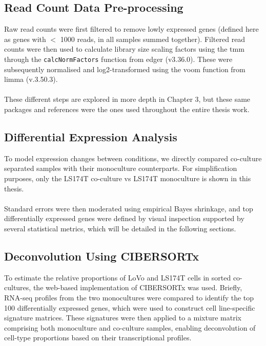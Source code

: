 \subsection{Read Count Data Pre-processing}

Raw read counts were first filtered to remove lowly expressed genes (defined here as genes with $<$ 1000 reads, in all samples summed together). Filtered read counts were then used to calculate library size scaling factors using the \gls{tmm}\cite{robinson_scaling_2010} through the \texttt{calcNormFactors} function from \gls{edger}\cite{robinson_edger_2010} (v3.36.0). These were subsequently normalised and log2-transformed using the \gls{voom}\cite{law_voom_2014} function from \gls{limma}\cite{ritchie_limma_2015} (v.3.50.3). 
\\
\\
These different steps are explored in more depth in Chapter 3, but these same packages and references were the ones used throughout the entire thesis work.

\subsection{Differential Expression Analysis}

To model expression changes between conditions, we directly compared co-culture separated samples with their monoculture counterparts. For simplification purposes, only the LS174T co-culture \gls{vs} LS174T monoculture is shown in this thesis.
\\
\\
Standard errors were then moderated using empirical Bayes shrinkage\cite{smyth_linear_nodate}, and top differentially expressed genes were defined by visual inspection supported by several statistical metrics, which will be detailed in the following sections.

\subsection{Deconvolution Using CIBERSORTx}

To estimate the relative proportions of LoVo and LS174T cells in sorted co-cultures, the web-based implementation of CIBERSORTx\cite{chen_profiling_2018} was used. Briefly, RNA-seq profiles from the two monocultures were compared to identify the top 100 differentially expressed genes, which were used to construct cell line-specific signature matrices. These signatures were then applied to a mixture matrix comprising both monoculture and co-culture samples, enabling deconvolution of cell-type proportions based on their transcriptional profiles.

